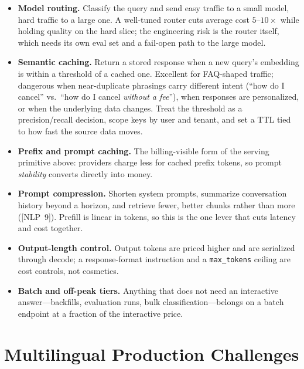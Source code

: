 \begin{itemize}
    \item \textbf{Model routing.}  Classify the query and send easy traffic to
          a small model, hard traffic to a large one.  A well-tuned router
          cuts average cost $5$--$10\times$ while holding quality on the hard
          slice; the engineering risk is the router itself, which needs its
          own eval set and a fail-open path to the large model.
    \item \textbf{Semantic caching.}  Return a stored response when a new
          query's embedding is within a threshold of a cached one.  Excellent
          for FAQ-shaped traffic; dangerous when near-duplicate phrasings
          carry different intent (``how do I cancel'' vs.\ ``how do I cancel
          \emph{without a fee}''), when responses are personalized, or when
          the underlying data changes.  Treat the threshold as a
          precision/recall decision, scope keys by user and tenant, and set a
          TTL tied to how fast the source data moves.
    \item \textbf{Prefix and prompt caching.}  The billing-visible form of the
          serving primitive above: providers charge less for cached prefix
          tokens, so prompt \emph{stability} converts directly into money.
    \item \textbf{Prompt compression.}  Shorten system prompts, summarize
          conversation history beyond a horizon, and retrieve fewer, better
          chunks rather than more ([NLP~9]).  Prefill is linear in tokens, so
          this is the one lever that cuts latency and cost together.
    \item \textbf{Output-length control.}  Output tokens are priced higher and
          are serialized through decode; a response-format instruction and a
          \texttt{max\_tokens} ceiling are cost controls, not cosmetics.
    \item \textbf{Batch and off-peak tiers.}  Anything that does not need an
          interactive answer---backfills, evaluation runs, bulk
          classification---belongs on a batch endpoint at a fraction of the
          interactive price.
\end{itemize}


\section{Multilingual Production Challenges}
\label{sec:multilingual_production}

